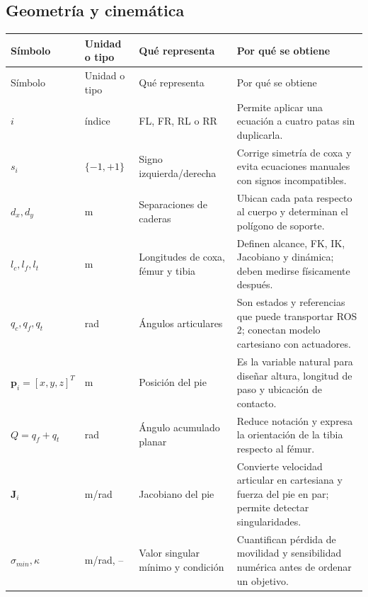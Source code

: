 \documentclass[11pt,letterpaper]{article}
\newcommand{\vect}[1]{\bm{#1}}
\newcommand{\mat}[1]{\bm{#1}}
\begin{document}
\subsection{Geometría y cinemática}
\footnotesize
\begin{longtable}{p{2.2cm}p{1.7cm}p{3.9cm}p{5.5cm}}
\toprule Símbolo&Unidad o tipo&Qué representa&Por qué se obtiene\\\midrule\endfirsthead
\toprule Símbolo&Unidad o tipo&Qué representa&Por qué se obtiene\\\midrule\endhead
$i$&índice&FL, FR, RL o RR&Permite aplicar una ecuación a cuatro patas sin
duplicarla.\\
$s_i$&$\{-1,+1\}$&Signo izquierda/derecha&Corrige simetría de coxa y evita
ecuaciones manuales con signos incompatibles.\\
$d_x,d_y$&m&Separaciones de caderas&Ubican cada pata respecto al cuerpo y
determinan el polígono de soporte.\\
$l_c,l_f,l_t$&m&Longitudes de coxa, fémur y tibia&Definen alcance, FK, IK,
Jacobiano y dinámica; deben medirse físicamente después.\\
$q_c,q_f,q_t$&rad&Ángulos articulares&Son estados y referencias que puede
transportar ROS 2; conectan modelo cartesiano con actuadores.\\
$\vect p_i=[x,y,z]^T$&m&Posición del pie&Es la variable natural para diseñar
altura, longitud de paso y ubicación de contacto.\\
$Q=q_f+q_t$&rad&Ángulo acumulado planar&Reduce notación y expresa la orientación
de la tibia respecto al fémur.\\
$\mat J_i$&m/rad&Jacobiano del pie&Convierte velocidad articular en cartesiana y
fuerza del pie en par; permite detectar singularidades.\\
$\sigma_{min},\kappa$&m/rad, --&Valor singular mínimo y condición&Cuantifican
pérdida de movilidad y sensibilidad numérica antes de ordenar un objetivo.\\
\bottomrule
\end{longtable}
\normalsize
\end{document}

